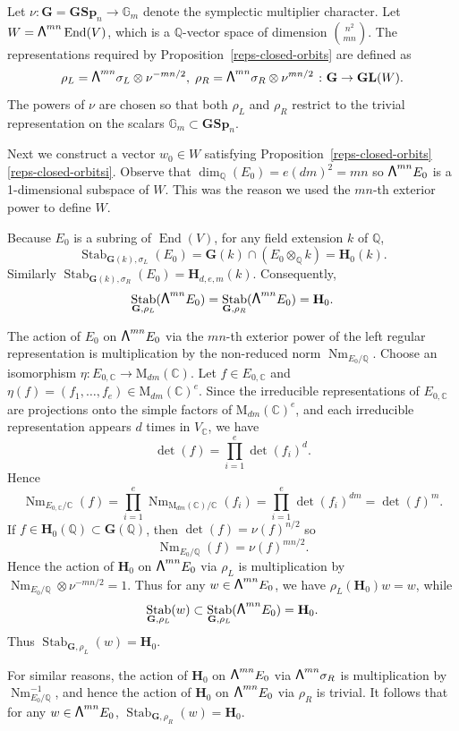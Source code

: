 \documentclass[JEP,XML,SOM,Unicode,NoFloatCountersInSection]{cedram}
\newcommand\bw{{\hbox{\large$\mathsf{\Lambda}$}}}
\newcommand{\bC}{\mathbb{C}}
\newcommand{\bG}{\mathbb{G}}
\newcommand{\bQ}{\mathbb{Q}}
\newcommand{\gG}{\mathbf{G}}
\newcommand{\gGL}{\mathbf{GL}}
\newcommand{\gGSp}{\mathbf{GSp}}
\newcommand{\gH}{\mathbf{H}}
\newcommand{\rM}{\mathrm{M}}
\DeclareMathOperator{\End}{End}
\DeclareMathOperator{\Nm}{Nm}
\DeclareMathOperator{\Stab}{Stab}
\let\extpower\bw
\begin{document}
Let $\nu \colon \gG = \gGSp_n \to \bG_m$ denote the symplectic multiplier character.
Let $W = \extpower^{mn} \End(V)$, which is a $\bQ$-vector space of dimension $\binom{n^2}{mn}$.
The representations required by Proposition~\ref{reps-closed-orbits} are defined as
\[
\rho_L = \extpower^{mn} \sigma_L \otimes \nu^{-mn/2}, \; \rho_R = \extpower^{mn} \sigma_R \otimes \nu^{mn/2} \; \colon \gG \to \gGL(W).
\]
The powers of $\nu$ are chosen so that both $\rho_L$ and $\rho_R$ restrict to the trivial representation on the scalars $\bG_m \subset \gGSp_n$.

Next we construct a vector $w_0 \in W$ satisfying Proposition~\ref{reps-closed-orbits}\eqref{reps-closed-orbitsi}.
Observe that $\dim_\bQ(E_0) = e(dm)^2 = mn$ so $\extpower^{mn} E_0$ is a 1-dimensional subspace of $W$.
This was the reason we used the $mn$-th exterior power to define $W$.

Because $E_0$ is a subring of $\End(V)$,
for any field extension $k$ of $\bQ$,
\[
\Stab_{\gG(k),\sigma_L}(E_0) = \gG(k) \cap (E_0 \otimes_\bQ k) = \gH_0(k).
\]
Similarly $\Stab_{\gG(k),\sigma_R}(E_0) = \gH_{d,e,m}(k)$.
Consequently,
\[
\Stab_{\gG,\rho_L}(\extpower^{mn} E_0) = \Stab_{\gG,\rho_R}(\extpower^{mn} E_0) = \gH_0.
\]

The action of $E_0$ on $\extpower^{mn} E_0$ via the $mn$-th exterior power of the left regular representation is multiplication by the non-reduced norm $\Nm_{E_0/\bQ}$.
Choose an isomorphism $\eta \colon E_{0,\bC} \to \rM_{dm}(\bC)$.
Let $f \in E_{0,\bC}$ and $\eta(f) = (f_1, \dotsc, f_e) \in \rM_{dm}(\bC)^e$.
Since the irre\-ducible representations of $E_{0,\bC}$ are projections onto the simple factors of $\rM_{dm}(\bC)^e$, and each irreducible representation appears $d$ times in $V_\bC$, we have
\[
\det(f) = \prod_{i=1}^e \det(f_i)^d.
\]
Hence
\[
\Nm_{E_{0,\bC}/\bC}(f) = \prod_{i=1}^e \Nm_{\rM_{dm}(\bC)/\bC}(f_i) = \prod_{i=1}^e \det(f_i)^{dm} = \det(f)^m.
\]
If $f \in \gH_0(\bQ) \subset \gG(\bQ)$, then $\det(f) = \nu(f)^{n/2}$ so
\[
\Nm_{E_0/\bQ}(f) = \nu(f)^{mn/2}.
\]
Hence the action of $\gH_0$ on $\extpower^{mn} E_0$ via $\rho_L$ is multiplication by $\Nm_{E_0/\bQ} \otimes \nu^{-mn/2} = 1$.
Thus for any $w \in \extpower^{mn} E_0$, we have $\rho_L(\gH_0)w = w$, while
\[
\Stab_{\gG,\rho_L}(w) \subset \Stab_{\gG,\rho_L}(\extpower^{mn} E_0) = \gH_0.
\]
Thus $\Stab_{\gG,\rho_L}(w) = \gH_0$.

For similar reasons, the action of $\gH_0$ on $\extpower^{mn} E_0$ via $\extpower^{mn} \sigma_R$ is multiplication by $\Nm_{E_0/\bQ}^{-1}$, and hence the action of $\gH_0$ on $\extpower^{mn} E_0$ via $\rho_R$ is trivial.
It follows that for any $w \in \extpower^{mn} E_0$, $\Stab_{\gG,\rho_R}(w) = \gH_0$.
\end{document}
